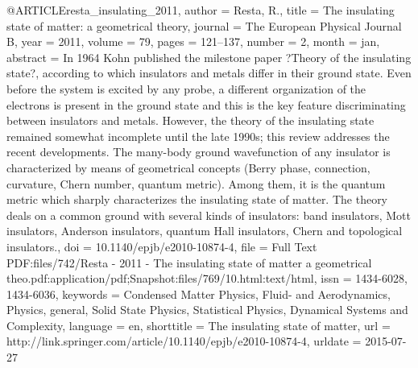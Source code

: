 @ARTICLE{resta_insulating_2011,
  author = {Resta, R.},
  title = {The insulating state of matter: a geometrical theory},
  journal = {The European Physical Journal B},
  year = {2011},
  volume = {79},
  pages = {121--137},
  number = {2},
  month = jan,
  abstract = {In 1964 Kohn published the milestone paper ?Theory of the insulating
	state?, according to which insulators and metals differ in their
	ground state. Even before the system is excited by any probe, a different
	organization of the electrons is present in the ground state and
	this is the key feature discriminating between insulators and metals.
	However, the theory of the insulating state remained somewhat incomplete
	until the late 1990s; this review addresses the recent developments.
	The many-body ground wavefunction of any insulator is characterized
	by means of geometrical concepts (Berry phase, connection, curvature,
	Chern number, quantum metric). Among them, it is the quantum metric
	which sharply characterizes the insulating state of matter. The theory
	deals on a common ground with several kinds of insulators: band insulators,
	Mott insulators, Anderson insulators, quantum Hall insulators, Chern
	and topological insulators.},
  doi = {10.1140/epjb/e2010-10874-4},
  file = {Full Text PDF:files/742/Resta - 2011 - The insulating state of matter a geometrical theo.pdf:application/pdf;Snapshot:files/769/10.html:text/html},
  issn = {1434-6028, 1434-6036},
  keywords = {Condensed Matter Physics, Fluid- and Aerodynamics, Physics, general,
	Solid State Physics, Statistical Physics, Dynamical Systems and Complexity},
  language = {en},
  shorttitle = {The insulating state of matter},
  url = {http://link.springer.com/article/10.1140/epjb/e2010-10874-4},
  urldate = {2015-07-27}
}

